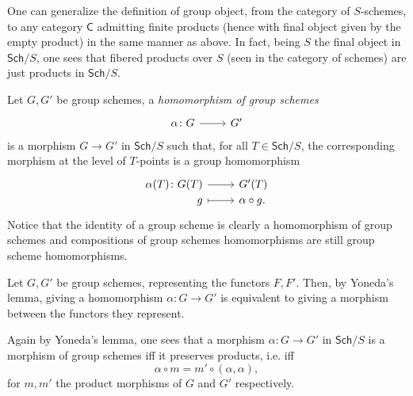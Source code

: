 \begin{rem}\label{rem:groupObject}
	One can generalize the definition of group object, from the category
	of $S$-schemes, to any category $\mathsf{C}$ admitting finite products
	(hence with final object given by the empty product) in the same manner as above.
	In fact, being $S$ the final object in $\mathsf{Sch}/S$, one sees
	that fibered products over $S$ (seen in the category of schemes)
	are just products in $\mathsf{Sch}/S$.
\end{rem}


\begin{defn}
	Let $G, G'$ be group schemes, a {\em homomorphism of group schemes}
	\begin{equation*}
		\begin{tikzcd}
			\alpha\colon G \arrow[r, "", rightarrow] &
			G'
		\end{tikzcd}
	\end{equation*} 
	is a morphism $G \to G'$ in $\mathsf{Sch}/S$ such that, for all
	$T \in \mathsf{Sch}/S$, the corresponding morphism at the level of $T$-points
	is a group homomorphism
	\begin{equation*}
	\begin{tikzcd}[row sep = 0ex
		,/tikz/column 1/.append style={anchor=base east}
		,/tikz/column 2/.append style={anchor=base west}]
		\alpha(T)\colon G(T) \arrow[r, "", rightarrow] &
		G'(T) \\
		g \arrow[r, "", mapsto] & \alpha \circ g.
	\end{tikzcd}
	\end{equation*} 
	Notice that the identity of a group scheme is clearly a homomorphism of group
	schemes and compositions of group schemes homomorphisms are still
	group scheme homomorphisms.
\end{defn}


\begin{rem}
	Let $G, G'$ be group schemes, representing the functors $F,F'$.
	Then, by Yoneda's lemma, giving a homomorphism $\alpha\colon G \to G'$
	is equivalent to giving a morphism between the functors they represent.

	Again by Yoneda's lemma, one sees that a morphism $\alpha\colon G \to G'$
	in $\mathsf{Sch}/S$ is a morphism of group schemes iff
	it preserves products, i.e. iff
	\begin{equation*}
		\alpha \circ m = m' \circ (\alpha, \alpha)
	,\end{equation*} 
	for $m, m'$ the product morphisms of $G$ and $G'$ respectively.
\end{rem}



